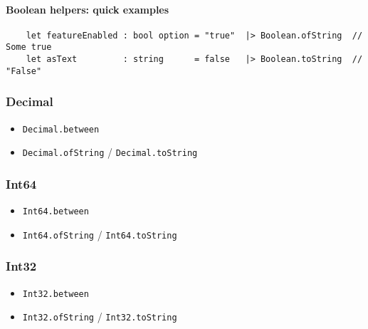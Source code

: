 \documentclass{article}
\begin{document}
\paragraph{Boolean helpers: quick examples}
\begin{verbatim}
    let featureEnabled : bool option = "true"  |> Boolean.ofString  // Some true
    let asText         : string      = false   |> Boolean.toString  // "False"
\end{verbatim}

\subsubsection{Decimal}

\begin{itemize}
\item \texttt{Decimal.between}
\item \texttt{Decimal.ofString} / \texttt{Decimal.toString}
\end{itemize}

\subsubsection{Int64}

\begin{itemize}
\item \texttt{Int64.between}
\item \texttt{Int64.ofString} / \texttt{Int64.toString}
\end{itemize}

\subsubsection{Int32}

\begin{itemize}
\item \texttt{Int32.between}
\item \texttt{Int32.ofString} / \texttt{Int32.toString}
\end{itemize}
\end{document}

